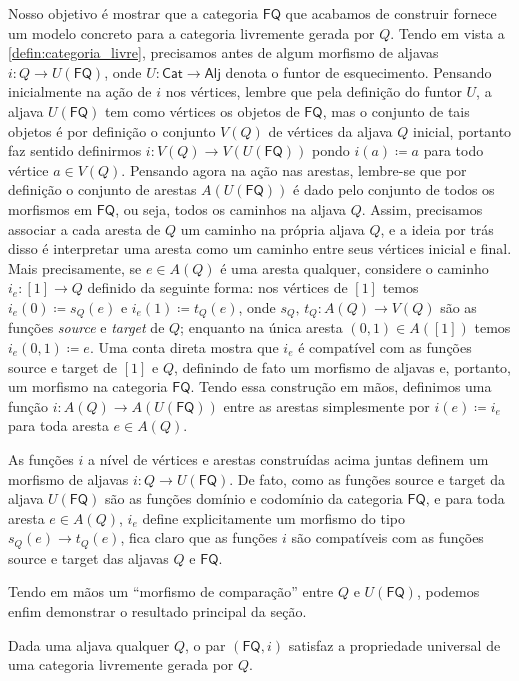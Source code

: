 Nosso objetivo é mostrar que a categoria $\mathsf{FQ}$ que acabamos de construir fornece um modelo concreto para a categoria livremente gerada por $Q$.
Tendo em vista a \cref{defin:categoria_livre}, precisamos antes de algum morfismo de aljavas $i: Q \to U(\mathsf{FQ})$, onde $U: \mathsf{Cat} \to \mathsf{Alj}$ denota o funtor de esquecimento.
Pensando inicialmente na ação de $i$ nos vértices, lembre que pela definição do funtor $U$, a aljava $U(\mathsf{FQ})$ tem como vértices os objetos de $\mathsf{FQ}$, mas o conjunto de tais objetos é por definição o conjunto $V(Q)$ de vértices da aljava $Q$ inicial, portanto faz sentido definirmos $i: V(Q) \to V(U(\mathsf{FQ}))$ pondo $i(a) \coloneqq a$ para todo vértice $a \in V(Q)$.
Pensando agora na ação nas arestas, lembre-se que por definição o conjunto de arestas $A(U(\mathsf{FQ}))$ é dado pelo conjunto de todos os morfismos em $\mathsf{FQ}$, ou seja, todos os caminhos na aljava $Q$.
Assim, precisamos associar a cada aresta de $Q$ um caminho na própria aljava $Q$, e a ideia por trás disso é interpretar uma aresta como um caminho entre seus vértices inicial e final.
Mais precisamente, se $e \in A(Q)$ é uma aresta qualquer, considere o caminho $i_e: [1] \to Q$ definido da seguinte forma: nos vértices de $[1]$ temos $i_e(0) \coloneqq s_Q(e)$ e $i_e(1) \coloneqq t_Q(e)$, onde $s_Q,\,t_Q: A(Q) \to V(Q)$ são as funções \emph{source} e \emph{target} de $Q$; enquanto na única aresta $(0,1) \in A([1])$ temos $i_e(0,1) \coloneqq e$.
Uma conta direta mostra que $i_e$ é compatível com as funções source e target de $[1]$ e $Q$, definindo de fato um morfismo de aljavas e, portanto, um morfismo na categoria $\mathsf{FQ}$.
Tendo essa construção em mãos, definimos uma função $i: A(Q) \to A(U(\mathsf{FQ}))$ entre as arestas simplesmente por $i(e) \coloneqq i_e$ para toda aresta $e \in A(Q)$.

As funções $i$ a nível de vértices e arestas construídas acima juntas definem um morfismo de aljavas $i: Q \to U(\mathsf{FQ})$.
De fato, como as funções source e target da aljava $U(\mathsf{FQ})$ são as funções domínio e codomínio da categoria $\mathsf{FQ}$, e para toda aresta $e \in A(Q)$, $i_e$ define explicitamente um morfismo do tipo $s_Q(e) \to t_Q(e)$, fica claro que as funções $i$ são compatíveis com as funções source e target das aljavas $Q$ e $\mathsf{FQ}$.

Tendo em mãos um ``morfismo de comparação'' entre $Q$ e $U(\mathsf{FQ})$, podemos enfim demonstrar o resultado principal da seção.

\begin{teo}
    Dada uma aljava qualquer $Q$, o par $(\mathsf{FQ},i)$ satisfaz a propriedade universal de uma categoria livremente gerada por $Q$.
\end{teo}

